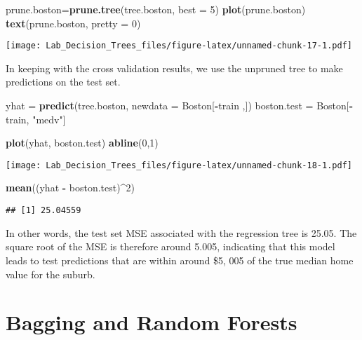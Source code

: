 \documentclass[]{article}
\newenvironment{Shaded}{\begin{snugshade}}{\end{snugshade}}
\newcommand{\KeywordTok}[1]{\textcolor[rgb]{0.13,0.29,0.53}{\textbf{#1}}}
\newcommand{\DataTypeTok}[1]{\textcolor[rgb]{0.13,0.29,0.53}{#1}}
\newcommand{\DecValTok}[1]{\textcolor[rgb]{0.00,0.00,0.81}{#1}}
\newcommand{\StringTok}[1]{\textcolor[rgb]{0.31,0.60,0.02}{#1}}
\newcommand{\OperatorTok}[1]{\textcolor[rgb]{0.81,0.36,0.00}{\textbf{#1}}}
\newcommand{\NormalTok}[1]{#1}
\begin{document}
\begin{Shaded}
\begin{Highlighting}[]
\NormalTok{prune.boston=}\KeywordTok{prune.tree}\NormalTok{(tree.boston, }\DataTypeTok{best =} \DecValTok{5}\NormalTok{)}
\KeywordTok{plot}\NormalTok{(prune.boston)}
\KeywordTok{text}\NormalTok{(prune.boston, }\DataTypeTok{pretty =} \DecValTok{0}\NormalTok{)}
\end{Highlighting}
\end{Shaded}

\texttt{[image: Lab\_Decision\_Trees\_files/figure-latex/unnamed-chunk-17-1.pdf]}

In keeping with the cross validation results, we use the unpruned tree
to make predictions on the test set.

\begin{Shaded}
\begin{Highlighting}[]
\NormalTok{yhat =}\StringTok{ }\KeywordTok{predict}\NormalTok{(tree.boston, }\DataTypeTok{newdata =}\NormalTok{ Boston[}\OperatorTok{-}\NormalTok{train ,])}
\NormalTok{boston.test =}\StringTok{ }\NormalTok{Boston[}\OperatorTok{-}\NormalTok{train, }\StringTok{"medv"}\NormalTok{]}

\KeywordTok{plot}\NormalTok{(yhat, boston.test)}
\KeywordTok{abline}\NormalTok{(}\DecValTok{0}\NormalTok{,}\DecValTok{1}\NormalTok{)}
\end{Highlighting}
\end{Shaded}

\texttt{[image: Lab\_Decision\_Trees\_files/figure-latex/unnamed-chunk-18-1.pdf]}

\begin{Shaded}
\begin{Highlighting}[]
\KeywordTok{mean}\NormalTok{((yhat }\OperatorTok{-}\StringTok{ }\NormalTok{boston.test)}\OperatorTok{^}\DecValTok{2}\NormalTok{)}
\end{Highlighting}
\end{Shaded}

\begin{verbatim}
## [1] 25.04559
\end{verbatim}

In other words, the test set MSE associated with the regression tree is
25.05. The square root of the MSE is therefore around 5.005, indicating
that this model leads to test predictions that are within around \$5,
005 of the true median home value for the suburb.

\section{Bagging and Random Forests}\label{bagging-and-random-forests}
\end{document}
